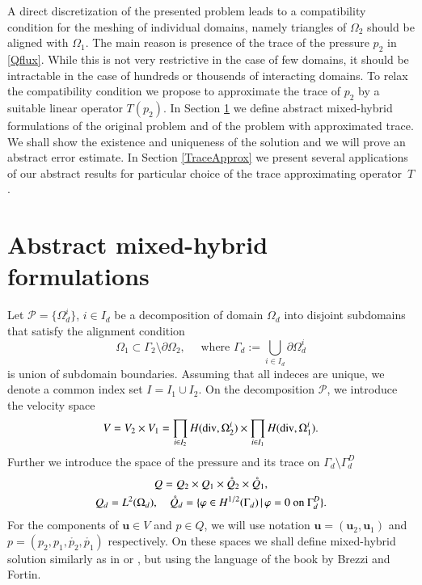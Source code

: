 \documentclass{elsarticle}
\def\div{{\rm div}}
\def\vc#1{\mathbf{\boldsymbol{#1}}}     %
\def\where{\,|\,}                    %
\def\prtl{\partial}                                        %
\def\vl{{\vc{u}}}
\def\phi{\varphi}
\def\mr{\mathring}
\begin{document}
A direct discretization of the presented problem leads to a compatibility condition for the meshing of individual domains,
namely triangles of $\Omega_2$ should be aligned with $\Omega_1$. The main reason is presence of the trace of the pressure $p_2$ in \eqref{Qflux}. While this is not very restrictive in the case of few domains,
it should be intractable in the case of hundreds or thousends of interacting domains. To relax the compatibility condition
we propose to approximate the trace of $p_2$ by a suitable linear operator $T(p_2)$. In Section \ref{AbstractSec} we
define abstract mixed-hybrid formulations of the original problem and of the problem with approximated trace. We shall show the existence and uniqueness of the solution and we will prove an abstract error estimate. In Section \ref{TraceApprox} we
present several applications of our abstract results for particular choice of the trace approximating operator~$T$. 



\section{Abstract mixed-hybrid formulations}
\label{AbstractSec}
Let $\mathcal P=\{\Omega_d^i\}$, $i\in I_d$ be a decomposition of domain $\Omega_d$ into disjoint subdomains
that satisfy the alignment condition
\begin{equation}\label{compatible}
        \Omega_1\subset \Gamma_2\setminus\prtl\Omega_2,\quad \text{ where }\Gamma_d:=\bigcup_{i\in I_d} \prtl\Omega_d^i
\end{equation}
is union of subdomain boundaries. Assuming that all indeces are unique, we denote a common index set $I=I_1\cup I_2$.
On the decomposition $\mathcal P$, we introduce the velocity space
\begin{equation}
        \label{Vspace}
        V=V_2\times V_1=
                \prod_{i\in I_2} H(\div,\Omega_2^i)\times \prod_{i\in I_1} H(\div,\Omega_1^i).
\end{equation}
Further we introduce the space of the pressure and its trace on $\Gamma_d\setminus \Gamma_d^D$
\begin{gather}
    \label{Pspace}  
        Q=Q_2\times Q_1\times \mr{Q}_2\times\mr{Q}_1,\\
    \notag
    Q_d=L^2(\Omega_d),\quad \mr{Q}_d=\{\phi\in H^{1/2}(\Gamma_d)\where \phi=0\text{ on }\Gamma_d^D\}.
\end{gather}
For the components of $\vl\in V$ and  $p\in Q$, we will use notation $\vl = (\vl_2,\vl_1)$ and  $p=(p_2,p_1,\mr{p_2},\mr{p_1})$ respectively.
On these spaces we shall define mixed-hybrid solution similarly as in  \cite{maryska_mixed-hybrid_1995} or \cite{arbogast_nonlinear_1996}, but using the language of the book \cite{fortin_mixed_1991} by Brezzi and Fortin.
\end{document}
